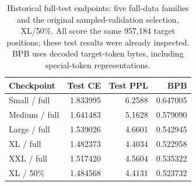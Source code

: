 \begin{table}[t]
\centering\small
\setlength{\tabcolsep}{4pt}
\caption{Historical full-test endpoints: five full-data families and the original sampled-validation selection, XL/50\%. All score the same 957,184 target positions; these test results were already inspected. BPB uses decoded target-token bytes, including special-token representations.}
\label{tab:test2}
\begin{tabular}{lrrr}
\toprule
Checkpoint & Test CE & Test PPL & BPB\\
\midrule
Small / full & 1.833995 & 6.2588 & 0.647005\\
Medium / full & 1.641483 & 5.1628 & 0.579090\\
Large / full & 1.539026 & 4.6601 & 0.542945\\
XL / full & 1.482373 & 4.4034 & 0.522958\\
XXL / full & 1.517420 & 4.5604 & 0.535322\\
XL / 50\% & 1.484568 & 4.4131 & 0.523732\\
\bottomrule
\end{tabular}
\end{table}
